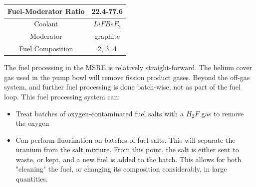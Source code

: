 \documentclass[letterpaper]{article}
\begin{document}
\begin{center}
\begin{tabular}{|c|c|}
\hline
Fuel-Moderator Ratio & 22.4-77.6 \\
\hline
Coolant & $LiFBeF_2$ \\
\hline
Moderator & graphite \\
\hline
Fuel Composition & 2, 3, 4 \\
\hline
\end{tabular}
\end{center}

The fuel processing in the MSRE is relatively straight-forward.  The helium cover gas used in the pump bowl will remove fission product gases.  Beyond the off-gas system, and further fuel processing is done batch-wise, not as part of the fuel loop.  This fuel processing system can:

\begin{itemize}
\item Treat batches of oxygen-contaminated fuel salts with a $H_2F$ gas to remove the oxygen
\item Can perform fluorination on batches of fuel salts.  This will separate the uranium from the salt mixture.  From this point, the salt is either sent to waste, or kept, and a new fuel is added to the batch.  This allows for both "cleaning" the fuel, or changing its composition considerably, in large quantities.
\end{itemize}
\end{document}
